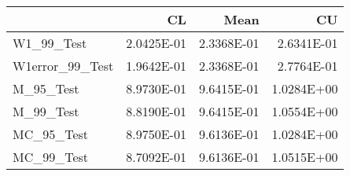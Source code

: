\begin{tabular}{lrrr}
\toprule
{} &         CL &       Mean &         CU \\
\midrule
W1\_99\_Test      & 2.0425E-01 & 2.3368E-01 & 2.6341E-01 \\
W1error\_99\_Test & 1.9642E-01 & 2.3368E-01 & 2.7764E-01 \\
M\_95\_Test       & 8.9730E-01 & 9.6415E-01 & 1.0284E+00 \\
M\_99\_Test       & 8.8190E-01 & 9.6415E-01 & 1.0554E+00 \\
MC\_95\_Test      & 8.9750E-01 & 9.6136E-01 & 1.0284E+00 \\
MC\_99\_Test      & 8.7092E-01 & 9.6136E-01 & 1.0515E+00 \\
\bottomrule
\end{tabular}
